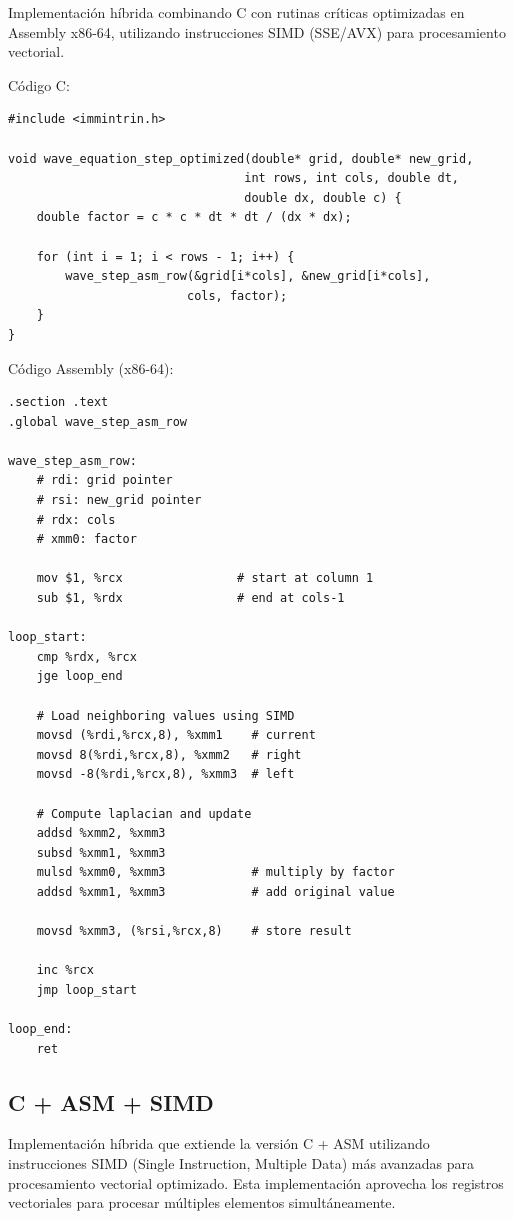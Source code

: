 \documentclass[a4paper]{article}
\begin{document}
Implementación híbrida combinando C con rutinas críticas optimizadas en Assembly x86-64, utilizando instrucciones SIMD (SSE/AVX) para procesamiento vectorial.

Código C:
\begin{verbatim}
#include <immintrin.h>

void wave_equation_step_optimized(double* grid, double* new_grid,
                                 int rows, int cols, double dt,
                                 double dx, double c) {
    double factor = c * c * dt * dt / (dx * dx);
    
    for (int i = 1; i < rows - 1; i++) {
        wave_step_asm_row(&grid[i*cols], &new_grid[i*cols], 
                         cols, factor);
    }
}
\end{verbatim}

Código Assembly (x86-64):
\begin{verbatim}
.section .text
.global wave_step_asm_row

wave_step_asm_row:
    # rdi: grid pointer
    # rsi: new_grid pointer  
    # rdx: cols
    # xmm0: factor
    
    mov $1, %rcx                # start at column 1
    sub $1, %rdx                # end at cols-1
    
loop_start:
    cmp %rdx, %rcx
    jge loop_end
    
    # Load neighboring values using SIMD
    movsd (%rdi,%rcx,8), %xmm1    # current
    movsd 8(%rdi,%rcx,8), %xmm2   # right
    movsd -8(%rdi,%rcx,8), %xmm3  # left
    
    # Compute laplacian and update
    addsd %xmm2, %xmm3            
    subsd %xmm1, %xmm3
    mulsd %xmm0, %xmm3            # multiply by factor
    addsd %xmm1, %xmm3            # add original value
    
    movsd %xmm3, (%rsi,%rcx,8)    # store result
    
    inc %rcx
    jmp loop_start
    
loop_end:
    ret
\end{verbatim}

\subsection{C + ASM + SIMD}

Implementación híbrida que extiende la versión C + ASM utilizando instrucciones SIMD (Single Instruction, Multiple Data) más avanzadas para procesamiento vectorial optimizado. Esta implementación aprovecha los registros vectoriales para procesar múltiples elementos simultáneamente.
\end{document}
